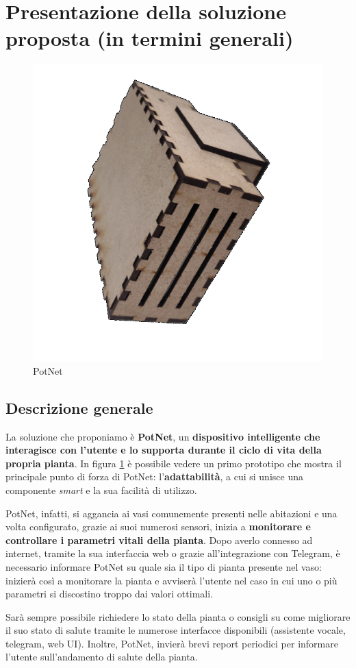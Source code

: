 \newpage
\section{Presentazione della soluzione proposta (in termini generali)}

\begin{figure}
	\centering
	\vspace{-15mm}
	\includegraphics[width=.4\textwidth]{images/potnet.png}
	\vspace{-7mm}
	\caption{PotNet}
	\vspace{-5mm}
	\label{fig:potnet}
\end{figure}

\subsection{Descrizione generale}

La soluzione che proponiamo è \textbf{PotNet}, un \textbf{dispositivo intelligente che interagisce con l'utente e lo supporta durante il ciclo di vita della propria pianta}. In figura \ref{fig:potnet} è possibile vedere un primo prototipo che mostra il principale punto di forza di PotNet: l'\textbf{adattabilità}, a cui si unisce una componente \textit{smart} e la sua facilità di utilizzo.

PotNet, infatti, si aggancia ai vasi comunemente presenti nelle abitazioni e una volta configurato, grazie ai suoi numerosi sensori, inizia a \textbf{monitorare e controllare i parametri vitali della pianta}.
Dopo averlo connesso ad internet, tramite la sua interfaccia web o grazie all'integrazione con Telegram, è necessario informare PotNet su quale sia il tipo di pianta presente nel vaso: inizierà così a monitorare la pianta e avviserà l'utente nel caso in cui uno o più parametri si discostino troppo dai valori ottimali.

Sarà sempre possibile richiedere lo stato della pianta o consigli su come migliorare il suo stato di salute tramite le numerose interfacce disponibili (assistente vocale, telegram, web UI). Inoltre, PotNet, invierà brevi report periodici per informare l'utente sull'andamento di salute della pianta.

